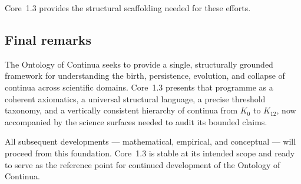 Core~1.3 provides the structural scaffolding needed for these efforts.

\subsection{Final remarks}

The Ontology of Continua seeks to provide a single, structurally grounded
framework for understanding the birth, persistence, evolution, and collapse of
continua across scientific domains. Core~1.3 presents that programme as a
coherent axiomatics, a universal structural language, a precise threshold
taxonomy, and a vertically consistent hierarchy of continua from \(K_0\) to
\(K_{12}\), now accompanied by the science surfaces needed to audit its bounded
claims.

All subsequent developments --- mathematical, empirical, and conceptual ---
will proceed from this foundation. Core~1.3 is stable at its intended scope and
ready to serve as the reference point for continued development of the
Ontology of Continua.
